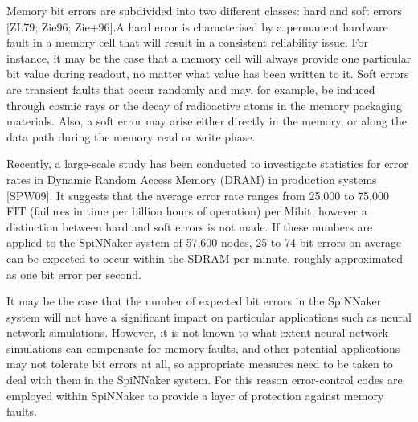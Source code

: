 \documentclass[a4paper, 11pt]{article}
\begin{document}
Memory bit errors are subdivided into two different classes: hard and soft errors [ZL79; Zie96; Zie+96].A hard error is characterised by a permanent hardware fault in a memory cell that will result in a consistent reliability issue. For instance, it may be the case that a memory cell will always provide one particular bit value during readout, no matter what value has been written to it. Soft errors are transient faults that occur randomly and may, for example, be induced through cosmic rays or the decay of radioactive atoms in the memory packaging materials. Also, a soft error may arise either directly in the memory, or along the data path during the memory read or write phase.

Recently, a large-scale study has been conducted to investigate statistics for error rates in Dynamic Random Access Memory (DRAM) in production systems [SPW09]. It suggests that the average error rate ranges from 25,000 to 75,000 FIT (failures in time per billion hours of operation) per Mibit, however a distinction between hard and soft errors is not made. If these numbers are applied to the SpiNNaker system of 57,600 nodes, 25 to 74 bit errors on average can be expected to occur within the SDRAM per minute, roughly approximated as one bit error per second.

It may be the case that the number of expected bit errors in the SpiNNaker system will not have a significant impact on particular applications such as neural network simulations. However, it is not known to what extent neural network simulations can compensate for memory faults, and other potential applications may not tolerate bit errors at all, so appropriate measures need to be taken to deal with them in the SpiNNaker system. For this reason error-control codes are employed within SpiNNaker to provide a layer of protection against memory faults.
\end{document}
